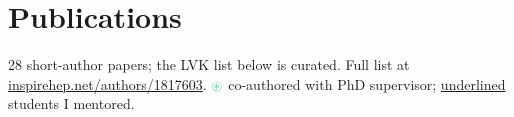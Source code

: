 

\nocite{*}


\section{Publications}

\noindent\small{28 short-author papers; the LVK list below is curated. Full list at
\href{https://inspirehep.net/authors/1817603?ui-citation-summary=true&ui-exclude-self-citations=true}{\textcolor{RedViolet}{inspirehep.net/authors/1817603}}. \quad $\textcolor{SeaGreen}{\circledast}$ co-authored with PhD supervisor; \quad \underline{underlined} students I mentored.}

\vspace{2pt}

\printbibliography[title={Short-Author Publications},filter=shortauthor, 
resetnumbers=true, 
heading=subbibliography]

\printbibliography[
  title={LVK Collaboration Publications with Significant Contributions},
  filter=collaboration,
  resetnumbers=true,
  heading=subbibliography]
